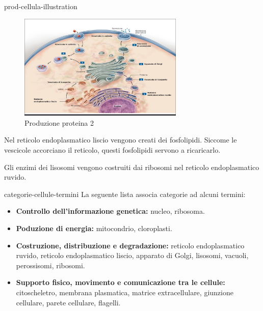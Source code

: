 \documentclass[preview]{standalone}
\begin{document}
\begin{snippet}{prod-cellula-illustration}
    \setlength{\intextsep}{0pt}%
    \begin{figure}
        \includegraphics[width=0.7\textwidth]{./resources/prod_cellula.png}
        \caption{Produzione proteina 2}
        \vspace{-1cm}
    \end{figure}
    
    Nel reticolo endoplasmatico liscio vengono creati dei fosfolipidi.
    Siccome le vescicole accorciano il reticolo, questi fosfolipidi servono a ricaricarlo.
    
    Gli enzimi dei lisosomi vengono costruiti dai ribosomi nel reticolo endoplasmatico ruvido.
    
    \wrapfill
\end{snippet}

\begin{snippet}{categorie-cellule-termini}
    La seguente lista associa categorie ad alcuni termini:
    \begin{itemize}
        \item \textbf{Controllo dell'informazione genetica:}
            nucleo, ribosoma.
        \item \textbf{Poduzione di energia:}
            mitocondrio, cloroplasti.
        \item \textbf{Costruzione, distribuzione e degradazione:}
            reticolo endoplasmatico ruvido,
            reticolo endoplasmatico liscio, apparato di Golgi,
            lisosomi, vacuoli, perossisomi, ribosomi.
        \item \textbf{Supporto fisico, movimento e comunicazione tra le cellule:}
            citoscheletro, membrana plasmatica, matrice extracellulare,
            giunzione cellulare, parete cellulare, flagelli.
    \end{itemize}
\end{snippet}
\end{document}
